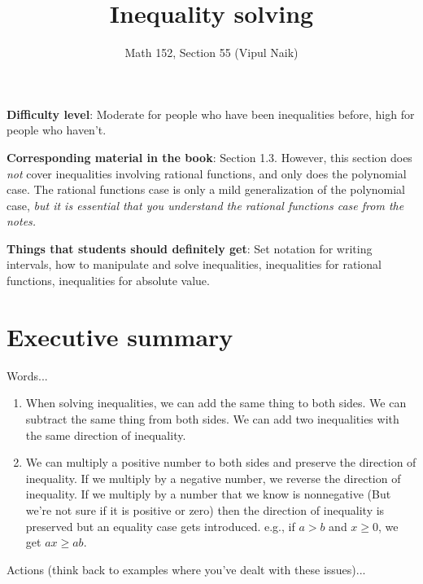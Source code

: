 \documentclass{amsart}
\title{Inequality solving}
\author{Math 152, Section 55 (Vipul Naik)}
\begin{document}
\maketitle

{\bf Difficulty level}: Moderate for people who have been inequalities
before, high for people who haven't.

{\bf Corresponding material in the book}: Section 1.3. However, this
section does {\em not} cover inequalities involving rational
functions, and only does the polynomial case. The rational functions
case is only a mild generalization of the polynomial case, {\em but it
  is essential that you understand the rational functions case from
  the notes.} 

{\bf Things that students should definitely get}: Set notation for
writing intervals, how to manipulate and solve inequalities,
inequalities for rational functions, inequalities for absolute value.

\section*{Executive summary}

Words...

\begin{enumerate}
\item When solving inequalities, we can add the same thing to both
  sides. We can subtract the same thing from both sides. We can add
  two inequalities with the same direction of inequality.
\item We can multiply a positive number to both sides and preserve the
  direction of inequality. If we multiply by a negative number, we
  reverse the direction of inequality. If we multiply by a number that
  we know is nonnegative (But we're not sure if it is positive or
  zero) then the direction of inequality is preserved but an equality
  case gets introduced. e.g., if $a > b$ and $x \ge 0$, we get $ax \ge ab$.
\end{enumerate}

Actions (think back to examples where you've dealt with these issues)...
\end{document}
